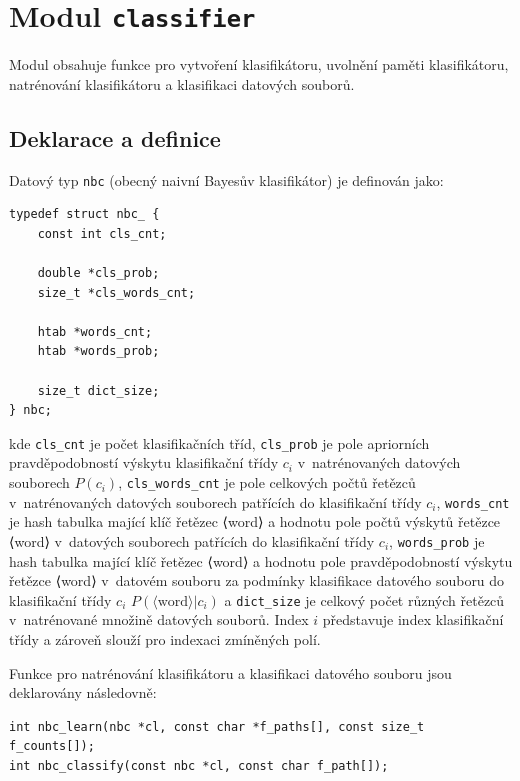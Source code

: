 \documentclass[a4paper, 12pt]{report}
\begin{document}
\section{Modul \texttt{classifier}}

Modul obsahuje funkce pro vytvoření klasifikátoru, uvolnění paměti 
klasifikátoru, natrénování klasifikátoru a klasifikaci datových souborů.

\subsection{Deklarace a definice}

Datový typ \texttt{nbc} (obecný naivní Bayesův klasifikátor) je definován 
jako:

\begin{lstlisting}
typedef struct nbc_ {
    const int cls_cnt;

    double *cls_prob;
    size_t *cls_words_cnt;

    htab *words_cnt;
    htab *words_prob;
    
    size_t dict_size;
} nbc;
\end{lstlisting}

kde \texttt{cls\_cnt} je počet klasifikačních tříd, \texttt{cls\_prob} je 
pole apriorních pravděpodobností výskytu klasifikační třídy $c_i$
v~natrénovaných datových souborech $P(c_i)$, \texttt{cls\_words\_cnt} je 
pole celkových počtů řetězců v~natrénovaných datových souborech patřících 
do klasifikační třídy $c_i$, \texttt{words\_cnt} je hash tabulka mající 
klíč řetězec ⟨word⟩ a hodnotu pole počtů výskytů řetězce ⟨word⟩ v~datových 
souborech patřících do klasifikační třídy $c_i$, \texttt{words\_prob} je 
hash tabulka mající klíč řetězec ⟨word⟩ a hodnotu pole pravděpodobností 
výskytu řetězce ⟨word⟩ v~datovém souboru za podmínky klasifikace datového 
souboru do klasifikační třídy $c_i$ $P(\langle \text{word} \rangle|c_i)$ a 
\texttt{dict\_size} je celkový počet různých řetězců v~natrénované množině 
datových souborů. Index $i$ představuje index klasifikační třídy a zároveň 
slouží pro indexaci zmíněných polí.

Funkce pro natrénování klasifikátoru a klasifikaci datového souboru jsou 
deklarovány následovně:

\begin{lstlisting}
int nbc_learn(nbc *cl, const char *f_paths[], const size_t f_counts[]);
int nbc_classify(const nbc *cl, const char f_path[]);
\end{lstlisting}
\end{document}
